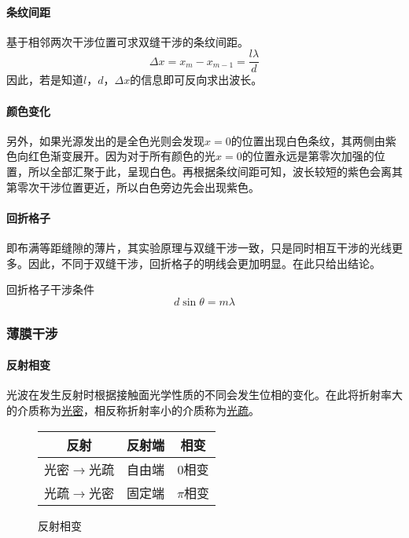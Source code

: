 \paragraph{条纹间距}基于相邻两次干涉位置可求双缝干涉的条纹间距。
\begin{equation*}
    \Delta x=x_m-x_{m-1}=\frac{l\lambda}{d}
\end{equation*}
因此，若是知道$l$，$d$，$\Delta x$的信息即可反向求出波长。

\paragraph{颜色变化}另外，如果光源发出的是全色光则会发现$x=0$的位置出现白色条纹，其两侧由紫色向红色渐变展开。因为对于所有颜色的光$x=0$的位置永远是第零次加强的位置，所以全部汇聚于此，呈现白色。再根据条纹间距可知，波长较短的紫色会离其第零次干涉位置更近，所以白色旁边先会出现紫色。

\paragraph{回折格子}即布满等距缝隙的薄片，其实验原理与双缝干涉一致，只是同时相互干涉的光线更多。因此，不同于双缝干涉，回折格子的明线会更加明显。在此只给出结论。
\begin{itembox}[l]{回折格子干涉条件}
    \begin{equation*}
        d\sin\theta=m\lambda
    \end{equation*}
\end{itembox}

\subsubsection{薄膜干涉}

\paragraph{反射相变}光波在发生反射时根据接触面光学性质的不同会发生位相的变化。在此将折射率大的介质称为\underline{光密}，相反称折射率小的介质称为\underline{光疏}。
\begin{figure}[ht!]
    \centering
    \renewcommand\arraystretch{1.2}
    \begin{tabular}{c|cc}
        \hline
        反射&反射端&相变\\\hline
        光密$\to$光疏&自由端&0相变\\
        光疏$\to$光密&固定端&$\pi$相变\\\hline
    \end{tabular}
    \caption{反射相变}
\end{figure}


